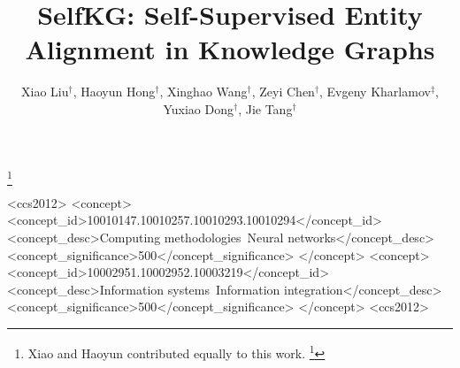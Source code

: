 \documentclass[sigconf]{acmart}
\theoremstyle{definition}
\begin{document}
\title{SelfKG: Self-Supervised Entity Alignment in Knowledge Graphs}

\author[ X. Liu, H. Hong, X. Wang, Z. Chen, E. Kharlamov, Y. Dong, J. Tang]{
    Xiao Liu$^{\dagger}$, Haoyun Hong$^{\dagger}$, Xinghao Wang$^\dagger$, Zeyi Chen$^{\dagger}$, Evgeny Kharlamov$^\ddagger$, \\Yuxiao Dong$^{\dagger}$, Jie Tang$^{\dagger}$%
}
  \thanks{Xiao and Haoyun contributed equally to this work. 
  \thanks{Jie Tang is the corresponding author}
  }

\renewcommand{\shortauthors}{X. Liu, H. Hong, X. Wang, Z. Chen, E. Kharlamov, Y. Dong, J. Tang}
\renewcommand{\authors}{Xiao Liu, Haoyun Hong, Xinghao Wang, Zeyi Chen, Evgeny Kharlamov, Yuxiao Dong, Jie Tang}
  







\begin{abstract} \label{sec:abs}

\end{abstract}


\begin{CCSXML}
<ccs2012>
    <concept>
       <concept_id>10010147.10010257.10010293.10010294</concept_id>
       <concept_desc>Computing methodologies~Neural networks</concept_desc>
       <concept_significance>500</concept_significance>
       </concept>
   <concept>
       <concept_id>10002951.10002952.10003219</concept_id>
       <concept_desc>Information systems~Information integration</concept_desc>
       <concept_significance>500</concept_significance>
       </concept>
<ccs2012>
\end{CCSXML}
\end{document}
